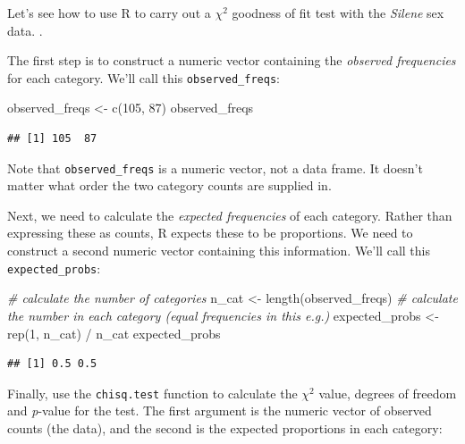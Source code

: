 \documentclass[
]{book}
\newenvironment{Shaded}{\begin{snugshade}}{\end{snugshade}}
\newcommand{\CommentTok}[1]{\textcolor[rgb]{0.56,0.35,0.01}{\textit{#1}}}
\newcommand{\DecValTok}[1]{\textcolor[rgb]{0.00,0.00,0.81}{#1}}
\newcommand{\FunctionTok}[1]{\textcolor[rgb]{0.00,0.00,0.00}{#1}}
\newcommand{\NormalTok}[1]{#1}
\newcommand{\OtherTok}[1]{\textcolor[rgb]{0.56,0.35,0.01}{#1}}
\newcommand{\SpecialCharTok}[1]{\textcolor[rgb]{0.00,0.00,0.00}{#1}}
\begin{document}
Let's see how to use R to carry out a \(\chi^{2}\) goodness of fit test with the \emph{Silene} sex data. .

The first step is to construct a numeric vector containing the \emph{observed frequencies} for each category. We'll call this \texttt{observed\_freqs}:

\begin{Shaded}
\begin{Highlighting}[]
\NormalTok{observed\_freqs }\OtherTok{\textless{}{-}} \FunctionTok{c}\NormalTok{(}\DecValTok{105}\NormalTok{, }\DecValTok{87}\NormalTok{)}
\NormalTok{observed\_freqs}
\end{Highlighting}
\end{Shaded}

\begin{verbatim}
## [1] 105  87
\end{verbatim}

Note that \texttt{observed\_freqs} is a numeric vector, not a data frame. It doesn't matter what order the two category counts are supplied in.

Next, we need to calculate the \emph{expected frequencies} of each category. Rather than expressing these as counts, R expects these to be proportions. We need to construct a second numeric vector containing this information. We'll call this \texttt{expected\_probs}:

\begin{Shaded}
\begin{Highlighting}[]
\CommentTok{\# calculate the number of categories}
\NormalTok{n\_cat }\OtherTok{\textless{}{-}} \FunctionTok{length}\NormalTok{(observed\_freqs)}
\CommentTok{\# calculate the number in each category (equal frequencies in this e.g.)}
\NormalTok{expected\_probs }\OtherTok{\textless{}{-}} \FunctionTok{rep}\NormalTok{(}\DecValTok{1}\NormalTok{, n\_cat) }\SpecialCharTok{/}\NormalTok{ n\_cat}
\NormalTok{expected\_probs}
\end{Highlighting}
\end{Shaded}

\begin{verbatim}
## [1] 0.5 0.5
\end{verbatim}

Finally, use the \texttt{chisq.test} function to calculate the \(\chi^{2}\) value, degrees of freedom and \emph{p}-value for the test. The first argument is the numeric vector of observed counts (the data), and the second is the expected proportions in each category:
\end{document}
